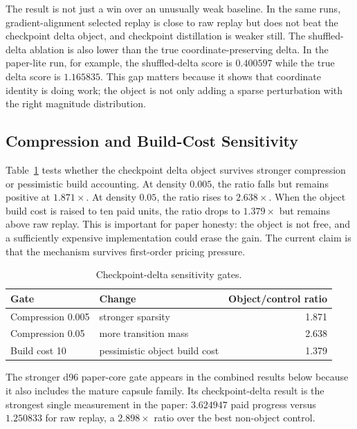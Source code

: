 \documentclass{article}
\begin{document}
The result is not just a win over an unusually weak baseline. In the same
runs, gradient-alignment selected replay is close to raw replay but does not
beat the checkpoint delta object, and checkpoint distillation is weaker still.
The shuffled-delta ablation is also lower than the true coordinate-preserving
delta. In the paper-lite run, for example, the shuffled-delta score is
$0.400597$ while the true delta score is $1.165835$. This gap matters because
it shows that coordinate identity is doing work; the object is not only adding
a sparse perturbation with the right magnitude distribution.

\subsection{Compression and Build-Cost Sensitivity}

Table~\ref{tab:checkpoint_delta_sensitivity} tests whether the checkpoint
delta object survives stronger compression or pessimistic build accounting.
At density $0.005$, the ratio falls but remains positive at $1.871\times$.
At density $0.05$, the ratio rises to $2.638\times$. When the object build
cost is raised to ten paid units, the ratio drops to $1.379\times$ but remains
above raw replay. This is important for paper honesty: the object is not free,
and a sufficiently expensive implementation could erase the gain. The current
claim is that the mechanism survives first-order pricing pressure.

\begin{table}[t]
  \centering
  \caption{Checkpoint-delta sensitivity gates.}
  \label{tab:checkpoint_delta_sensitivity}
  \begin{tabular}{llr}
    \toprule
    Gate & Change & Object/control ratio \\
    \midrule
    Compression 0.005 & stronger sparsity & 1.871 \\
    Compression 0.05 & more transition mass & 2.638 \\
    Build cost 10 & pessimistic object build cost & 1.379 \\
    \bottomrule
  \end{tabular}
\end{table}

The stronger d96 paper-core gate appears in the combined results below because
it also includes the mature capsule family. Its checkpoint-delta result is the
strongest single measurement in the paper: $3.624947$ paid progress versus
$1.250833$ for raw replay, a $2.898\times$ ratio over the best non-object
control.
\end{document}
